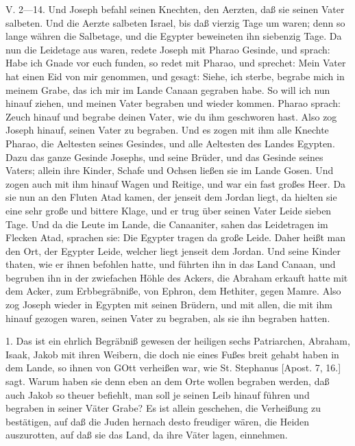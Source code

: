 V. 2—14. Und Joseph befahl seinen Knechten, den Aerzten, daß sie seinen Vater salbeten. Und die Aerzte salbeten Israel, bis daß vierzig Tage um waren; denn so lange währen die Salbetage, und die Egypter beweineten ihn siebenzig Tage. Da nun die Leidetage aus waren, redete Joseph mit Pharao Gesinde, und sprach: Habe ich Gnade vor euch funden, so redet mit Pharao, und sprechet: Mein Vater hat einen Eid von mir genommen, und gesagt: Siehe, ich sterbe, begrabe mich in meinem Grabe, das ich mir im Lande Canaan gegraben habe. So will ich nun hinauf ziehen, und meinen Vater begraben und wieder kommen. Pharao sprach: Zeuch hinauf und begrabe deinen Vater, wie du ihm geschworen hast. Also zog Joseph hinauf, seinen Vater zu begraben. Und es zogen mit ihm alle Knechte Pharao, die Aeltesten seines Gesindes, und alle Aeltesten des Landes Egypten. Dazu das ganze Gesinde Josephs, und seine Brüder, und das Gesinde seines Vaters; allein ihre Kinder, Schafe und Ochsen ließen sie im Lande Gosen. Und zogen auch mit ihm hinauf Wagen und Reitige, und war ein fast großes Heer. Da sie nun an den Fluten Atad kamen, der jenseit dem Jordan liegt, da hielten sie eine sehr große und bittere Klage, und er trug über seinen Vater Leide sieben Tage. Und da die Leute im Lande, die Canaaniter, sahen das Leidetragen im Flecken Atad, sprachen sie: Die Egypter tragen da große Leide. Daher heißt man den Ort, der Egypter Leide, welcher liegt jenseit dem Jordan. Und seine Kinder thaten, wie er ihnen befohlen hatte, und führten ihn in das Land Canaan, und begruben ihn in der zwiefachen Höhle des Ackers, die Abraham erkauft hatte mit dem Acker, zum Erbbegräbniße, von Ephron, dem Hethiter, gegen Mamre. Also zog Joseph wieder in Egypten mit seinen Brüdern, und mit allen, die mit ihm hinauf gezogen waren, seinen Vater zu begraben, als sie ihn begraben hatten.

1. Das ist ein ehrlich Begräbniß gewesen der heiligen sechs Patriarchen, Abraham, Isaak, Jakob mit ihren Weibern, die doch nie eines Fußes breit gehabt haben in dem Lande, so ihnen von GOtt verheißen war, wie St. Stephanus [Apost. 7, 16.] sagt. Warum haben sie denn eben an dem Orte wollen begraben werden, daß auch Jakob so theuer befiehlt, man soll je seinen Leib hinauf führen und begraben in seiner Väter Grabe? Es ist allein geschehen, die Verheißung zu bestätigen, auf daß die Juden hernach desto freudiger wären, die Heiden auszurotten, auf daß sie das Land, da ihre Väter lagen, einnehmen.

